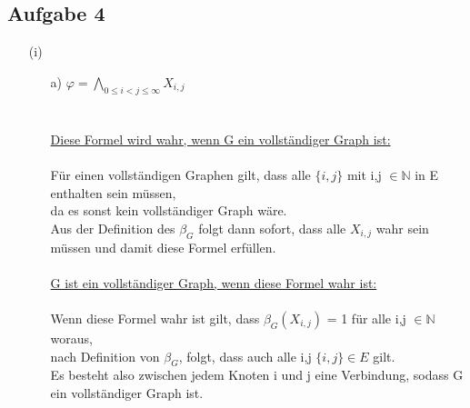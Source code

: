 \documentclass[a4paper,10pt]{article}
\begin{document}
	\subsection*{Aufgabe 4}
	\begin{enumerate}
	\item[(i)]
		\begin{enumerate}
		\item[a)]
		\(\varphi = \bigwedge\limits_{0 \leq i < j \leq \infty} X_{i,j} \)
		\\
		\\
		\\
		\underline{Diese Formel wird wahr, wenn G ein vollständiger Graph ist:}\\
		\\
		Für einen vollständigen Graphen gilt, dass alle $\{i,j\}$ mit i,j $\in \mathbb{N}$ in E enthalten sein müssen, \\
		da es sonst kein vollständiger Graph wäre. \\
		Aus der Definition des $\beta_G$ folgt dann sofort, dass alle $X_{i,j}$ wahr sein müssen und damit diese Formel erfüllen. \\
		\\
		\underline{G ist ein vollständiger Graph, wenn diese Formel wahr ist:}\\
		\\
		Wenn diese Formel wahr ist gilt, dass $\beta_G (X_{i,j})$ = 1 für alle i,j $\in \mathbb{N}$ woraus,\\
		nach Definition von $\beta_G$, folgt, dass auch alle i,j $\{i,j\} \in E$ gilt. \\
		Es besteht also zwischen jedem Knoten i und j eine Verbindung, sodass G ein vollständiger Graph ist.
		

\end{enumerate}
\end{enumerate}
\end{document}
